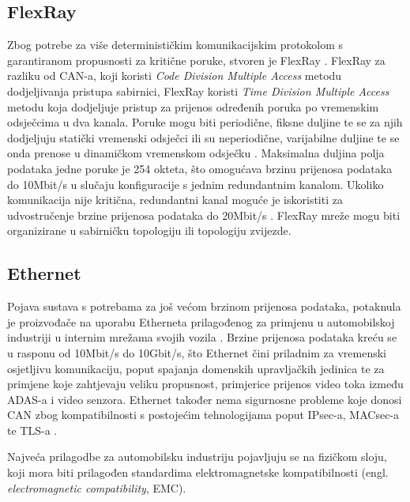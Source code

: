 \documentclass[times, utf8, diplomski, numeric]{fer}
\begin{document}
\subsection{FlexRay}
Zbog potrebe za više determinističkim komunikacijskim protokolom s garantiranom propusnosti za kritične poruke, stvoren je FlexRay \cite{nasser2023automotive}. FlexRay za razliku od CAN-a, koji koristi \textit{Code Division Multiple Access} metodu dodjeljivanja pristupa sabirnici, FlexRay koristi \textit{Time Division Multiple Access} metodu koja dodjeljuje pristup za prijenos određenih poruka po vremenskim odsječcima u dva kanala. Poruke mogu biti periodične, fiksne duljine te se za njih dodjeljuju statički vremenski odsječci ili su neperiodične, varijabilne duljine te se onda prenose u dinamičkom vremenskom odsječku \cite{nasser2023automotive}. Maksimalna duljina polja podataka jedne poruke je 254 okteta, što omogućava brzinu prijenosa podataka do 10Mbit/s u slučaju konfiguracije s jednim redundantnim kanalom. Ukoliko komunikacija nije kritična, redundantni kanal moguće je iskoristiti za udvostručenje brzine prijenosa podataka do 20Mbit/s \cite{nasser2023automotive, bosch2022handbook}. FlexRay mreže mogu biti organizirane u sabirničku topologiju ili topologiju zvijezde.
\subsection{Ethernet}
Pojava sustava s potrebama za još većom brzinom prijenosa podataka, potaknula je proizvođače na uporabu Etherneta prilagođenog za primjenu u automobilskoj industriji  u internim mrežama svojih vozila \cite{nasser2023automotive, bosch2022handbook}. Brzine prijenosa podataka kreću se u rasponu od 10Mbit/s do 10Gbit/s, što Ethernet čini priladnim za vremenski osjetljivu komunikaciju, poput spajanja domenskih upravljačkih jedinica te za primjene koje zahtjevaju veliku propusnost, primjerice prijenos video toka između ADAS-a i video senzora. Ethernet također nema sigurnosne probleme koje donosi CAN zbog kompatibilnosti s postojećim tehnologijama poput IPsec-a, MACsec-a te TLS-a \cite{vector2021uds}.

Najveća prilagodbe za automobilsku industriju pojavljuju se na fizičkom sloju, koji mora biti prilagođen standardima elektromagnetske kompatibilnosti (engl. \textit{electromagnetic compatibility}, EMC).
\end{document}
